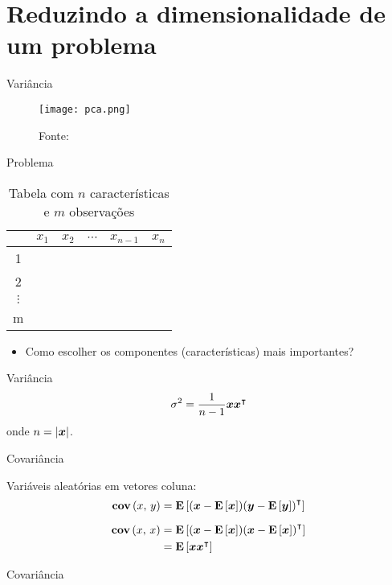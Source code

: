 \section{Reduzindo a dimensionalidade de um problema}

\begin{frame}{Variância}
  \begin{figure}[t]
    \texttt{[image: pca.png]}
    \caption{Fonte: \cite{scholz2006approaches}}
    \centering
  \end{figure}
\end{frame}

\begin{frame}{Problema}

  \begin{table}
    \centering
    \begin{tabular}{ |c|c|c|c|c|c| }
    \hline
    & $x_1$ & $x_2$ & $\cdots$ & $x_{n-1}$ & $x_{n}$ \\ 
    \hline
    1 & & & & & \\ 
    \hline
    2 & & & & & \\ 
    \hline
    $\vdots$ & & & & & \\ 
    \hline
    m & & & & & \\ 
    \hline
    \end{tabular}
    \caption{Tabela com $n$ características e $m$ observações}
  \end{table}

  \begin{itemize}
    \item Como escolher os componentes (características) mais importantes?
  \end{itemize}

\end{frame}

\begin{frame}{Variância}
  \[ \sigma^2 = \frac{1}{n-1} \boldsymbol{x} {\boldsymbol{x}}^\intercal \]
  onde $n = \lvert\boldsymbol{x}\rvert$.
\end{frame}

\begin{frame}{Covariância}
  \begin{defn}{Variáveis aleatórias em vetores coluna:}
    \[ \textbf{cov}\left(x,\, y\right) = \mathbf{E}\left[(\boldsymbol{x} - \mathbf{E}\left[\boldsymbol{x}\right]) {(\boldsymbol{y} - \mathbf{E}\left[\boldsymbol{y}\right])}^\intercal\right] \]

    \begin{align*}
      \textbf{cov}\left(x,\, x\right) &= \mathbf{E}\left[(\boldsymbol{x} - \mathbf{E}\left[\boldsymbol{x}\right]) {(\boldsymbol{x} - \mathbf{E}\left[\boldsymbol{x}\right])}^\intercal\right]\\
      &= \mathbf{E}\left[\boldsymbol{x} {\boldsymbol{x}}^\intercal\right]
    \end{align*}
  \end{defn}
\end{frame}

\begin{frame}{Covariância}

\end{frame}

